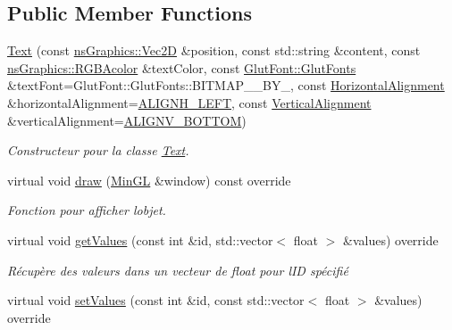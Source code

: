 \subsection*{Public Member Functions}
\begin{DoxyCompactItemize}
\item 
\hyperlink{classns_gui_1_1_text_a2d86c3b73f670c0ae206c4f35401a09f}{Text} (const \hyperlink{classns_graphics_1_1_vec2_d}{ns\+Graphics\+::\+Vec2D} \&position, const std\+::string \&content, const \hyperlink{classns_graphics_1_1_r_g_b_acolor}{ns\+Graphics\+::\+R\+G\+B\+Acolor} \&text\+Color, const \hyperlink{classns_gui_1_1_glut_font_aeeeb02d69e7dfc7e57957bd658c465ce}{Glut\+Font\+::\+Glut\+Fonts} \&text\+Font=Glut\+Font\+::\+Glut\+Fonts\+::\+B\+I\+T\+M\+A\+P\+\_\+\_\+\+B\+Y\+\_, const \hyperlink{classns_gui_1_1_text_a78bb37c174a4f37eec2b7d69459ee7dc}{Horizontal\+Alignment} \&horizontal\+Alignment=\hyperlink{classns_gui_1_1_text_a78bb37c174a4f37eec2b7d69459ee7dca7b5a51aac14cb50d1840e3f3de485ac2}{A\+L\+I\+G\+N\+H\+\_\+\+L\+E\+FT}, const \hyperlink{classns_gui_1_1_text_a3b0b5071a55982d5612c457a832f80fa}{Vertical\+Alignment} \&vertical\+Alignment=\hyperlink{classns_gui_1_1_text_a3b0b5071a55982d5612c457a832f80faace396f1024afc2c37173ea637856e25f}{A\+L\+I\+G\+N\+V\+\_\+\+B\+O\+T\+T\+OM})
\begin{DoxyCompactList}\small\item\em Constructeur pour la classe \hyperlink{classns_gui_1_1_text}{Text}. \end{DoxyCompactList}\item 
virtual void \hyperlink{classns_gui_1_1_text_ac353893e3b7cce7585c619acbc0e255b}{draw} (\hyperlink{class_min_g_l}{Min\+GL} \&window) const override
\begin{DoxyCompactList}\small\item\em Fonction pour afficher l\textquotesingle{}objet. \end{DoxyCompactList}\item 
virtual void \hyperlink{classns_gui_1_1_text_a4e23cbbe0345c0742c228d3ab98967c5}{get\+Values} (const int \&id, std\+::vector$<$ float $>$ \&values) override
\begin{DoxyCompactList}\small\item\em Récupère des valeurs dans un vecteur de float pour l\textquotesingle{}ID spécifié \end{DoxyCompactList}\item 
virtual void \hyperlink{classns_gui_1_1_text_ac1145b3ef4722b7cc9ae111372b84576}{set\+Values} (const int \&id, const std\+::vector$<$ float $>$ \&values) override

\end{DoxyCompactItemize}
